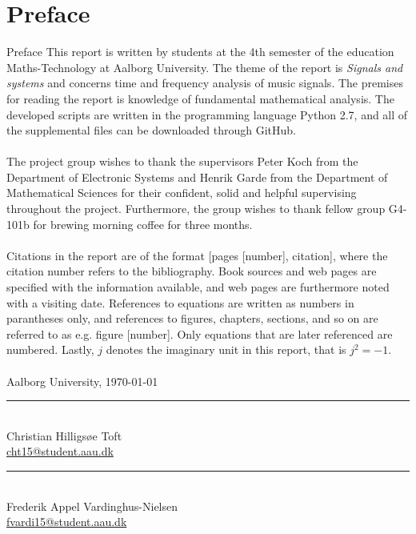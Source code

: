\clearpage
\chapter*{Preface}
{Preface}
This report is written by students at the 4th semester of the education Maths-Technology at Aalborg University. The theme of the report is \textit{Signals and systems} and concerns time and frequency analysis of music signals. The premises for reading the report is knowledge of fundamental mathematical analysis. The developed scripts are written in the programming language Python 2.7, and all of the supplemental files can be downloaded through GitHub.
\\ \\
The project group wishes to thank the supervisors Peter Koch from the Department of Electronic Systems and Henrik Garde from the Department of Mathematical Sciences for their confident, solid and helpful supervising throughout the project. Furthermore, the group wishes to thank fellow group G4-101b for brewing morning coffee for three months.
\\ \\
Citations in the report are of the format [pages [number], citation], where the citation number refers to the bibliography. Book sources and web pages are specified with the information available, and web pages are furthermore noted with a visiting date. References to equations are written as numbers in parantheses only, and references to figures, chapters, sections, and so on are referred to as e.g. figure [number]. Only equations that are later referenced are numbered. Lastly, $j$ denotes the imaginary unit in this report, that is $j^2 = -1$.
\\ \\
\vspace{\baselineskip}\hfill Aalborg University, \today
\vfill\noindent
\begin{minipage}[b]{0.45\textwidth}
 \centering
 \rule{\textwidth}{0.5pt}\\
Christian Hilligsøe Toft\\
 {\footnotesize \href{mailto:cht15@student.aau.dk}{cht15@student.aau.dk}}  
\end{minipage}
\hfill
\begin{minipage}[b]{0.45\textwidth}
 \centering
 \rule{\textwidth}{0.5pt}\\
Frederik Appel Vardinghus-Nielsen\\
 {\footnotesize \href{mailto:fvardi15@student.aau.dk}{fvardi15@student.aau.dk}}
\end{minipage}
